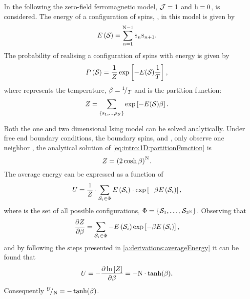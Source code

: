 	In the following the zero-field ferromagnetic model, \ie \mbox{$\mathcal{J} = 1$} and \mbox{$\mathrm{h} = 0$},  is considered. The energy \energy of a configuration of spins, \configuration{}, in this model is given by 
	\begin{equation*}
		E\left(\mathcal{S}_{}\right) = \sum_{n = 1}^{\mathrm{N} - 1}\textsc{s}_{n}\textsc{s}_{n+1}.
	\end{equation*}
	The probability of realising a configuration of spins \configuration{} with energy \energy is given by
	\begin{equation}
		\label{eq:intro:1D:configurationProbability}
		P\left(\mathcal{S}_{}\right) = 
		\frac{1}{Z} \exp\left[-{E(\mathcal{S}_{})}\frac{1}{T}\right],
	\end{equation}
	where \temperature represents the temperature, $\beta = {}^{1}\!/_{T}$ and \partitionfunction is the partition function:
	\begin{equation}
		\label{eq:intro:1D:partitionFunction}
		Z = \sum_{\left\{\textsc{s}_{1}, \dotsc, \textsc{s}_{\mathrm{N}} \right\}} \exp\left[- {E(\mathcal{S}_{})} \beta \right].
	\end{equation}

	Both the one and two dimensional Ising model can be solved analytically. Under free end boundary conditions, \ie the boundary spins,  and \spin{\numberOfSpins}, only observe one neighbor \cite{landau2014guide}, the analytical solution of \cref{eq:intro:1D:partitionFunction} is
	\begin{equation}
		\label{eq:introduced1D:partitionFunctionAnalyticalSolution}
		Z = {(2 \cosh \beta)}^\mathrm{N}.
	\end{equation}
	The average energy can be expressed as a function of \partitionfunction \cite{Murray20011Handout}
	\begin{equation*}
		U = \frac{1}{Z} \cdot \sum_{\mathcal{S}_{i} \in \Phi} E\left(\mathcal{S}_{i}\right) \cdot \exp\left[-\beta E\left(\mathcal{S}_{i}\right) \right],
	\end{equation*} 
	where \allPossibleConfigurations is the set of all possible configurations, \ie $\Phi = \left\{\mathcal{S}_{1}, \dotsc, \mathcal{S}_{2^\mathrm{N}}\right\}$. Observing that
	\begin{equation*}
		\frac{\partial Z}{\partial \beta} = \sum_{\mathcal{S}_{i} \in \Phi} - E\left(\mathcal{S}_{i}\right) \exp\left[-\beta E\left(\mathcal{S}_{i}\right) \right],
	\end{equation*}
	and by following the steps presented in \cref{a:derivations:averageEnergy} it can be found that
	\begin{equation*}
		U = - \frac{\partial \ln \left[ Z \right]}{\partial \beta} = - \mathrm{N} \cdot \tanh (\beta).
	\end{equation*}
	Consequently ${}^{U}\!/_{\mathrm{N}} = - \tanh (\beta)$.


